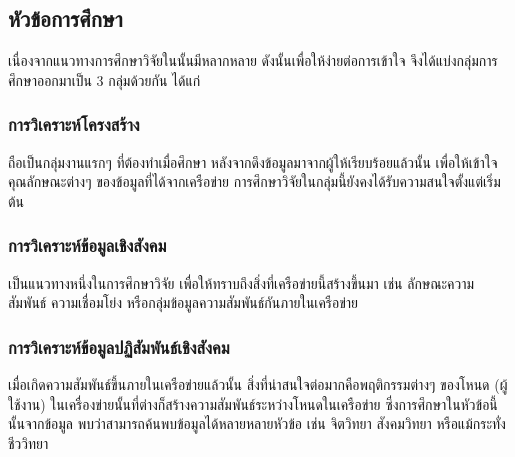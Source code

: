 \subsection{หัวข้อการศึกษา}

เนื่องจากแนวทางการศึกษาวิจัยใน{\OSN}นั้นมีหลากหลาย ดังนั้นเพื่อให้ง่ายต่อการเข้าใจ 
จึงได้แบ่งกลุ่มการศึกษาออกมาเป็น 3 กลุ่มด้วยกัน ได้แก่

\subsubsection{การวิเคราะห์โครงสร้าง} ถือเป็นกลุ่มงานแรกๆ ที่ต้องทำเมื่อศึกษา{\OSN} 
หลังจากดึงข้อมูลมาจากผู้ให้{\SNS}เรียบร้อยแล้วนั้น เพื่อให้เข้าใจคุณลักษณะต่างๆ 
ของข้อมูลที่ได้จากเครือข่าย การศึกษาวิจัยในกลุ่มนี้ยังคงได้รับความสนใจตั้งแต่เริ่มต้น 

\subsubsection{การวิเคราะห์ข้อมูลเชิงสังคม} เป็นแนวทางหนึ่งในการศึกษาวิจัย 
เพื่อให้ทราบถึงสิ่งที่เครือข่ายนี้สร้างขึ้นมา เช่น ลักษณะความสัมพันธ์ ความเชื่อมโย่ง 
หรือกลุ่มข้อมูลความสัมพันธ์กันภายในเครือข่าย

\subsubsection{การวิเคราะห์ข้อมูลปฏิสัมพันธ์เชิงสังคม} 
เมื่อเกิดความสัมพันธ์ขึ้นภายในเครือข่ายแล้วนั้น
สิ่งที่น่าสนใจต่อมากคือพฤติกรรมต่างๆ ของโหนด (ผู้ใช้งาน) 
ในเครื่องข่ายนั้นที่ต่างก็สร้างความสัมพันธ์ระหว่างโหนดในเครือข่าย 
ซึ่งการศึกษาในหัวข้อนี้นั้นจากข้อมูล พบว่าสามารถค้นพบข้อมูลได้หลายหลายหัวข้อ เช่น 
จิตวิทยา สังคมวิทยา หรือแม้กระทั่งชีววิทยา 